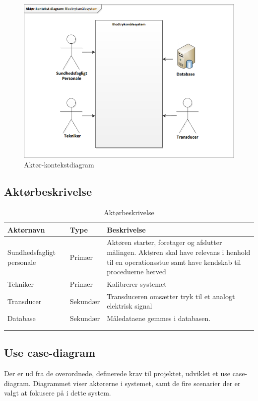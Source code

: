 \begin{figure}[H]
\centering
\includegraphics[scale=0.70]{ak.PNG}
\caption{Aktør-kontekstdiagram}
\end{figure}

\newpage

\subsection{Aktørbeskrivelse}

\begin{longtabu} to 
    \textbf{Aktørnavn} &        \textbf{Type} &    \textbf{Beskrivelse}\\[-1ex]
    \midrule
    Sundhedsfagligt personale &    Primær &    Aktøren starter, foretager og afslutter målingen. Aktøren skal have relevans i henhold til en operationsstue samt have kendskab til proceduerne herved\\
        Tekniker &       Primær &    Kalibrerer systemet\\
    Transducer &        Sekundær &    Transduceren omsætter tryk til et analogt elektrisk signal\\
    Database &        Sekundær &    Måledataene gemmes i databasen.\\

    
\caption{Aktørbeskrivelse}\\
\label{actortable}
\end{longtabu}


\subsection{Use case-diagram}
Der er ud fra de overordnede, definerede krav til projektet, udviklet et use case-diagram. Diagrammet viser aktørerne i systemet, samt de fire scenarier der er valgt at fokusere på i dette system. 

